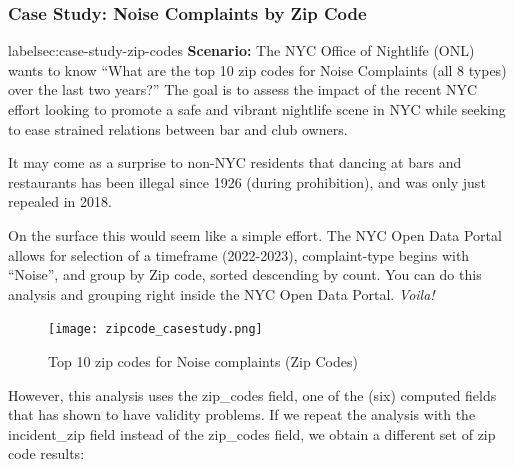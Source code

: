 \documentclass[12pt, titlepage]{article}
\begin{document}
		\subsubsection{Case Study: Noise Complaints by Zip Code}{label{sec:case-study-zip-codes}
		\textbf{Scenario:} The NYC Office of Nightlife (ONL) wants to know ``What are the top 10 zip codes for Noise Complaints (all 8 types) over the last two years?''
		The goal is to assess the impact of the recent NYC effort looking to promote a safe and vibrant nightlife scene in NYC while seeking to ease
		strained relations between bar and club owners. 
		
		It may come as a surprise to non-NYC residents that dancing at bars and restaurants has been illegal since 1926 (during prohibition), and was only just repealed in 2018. 
		
		On the surface this would seem like a simple effort.  The NYC Open Data Portal allows for selection of a timeframe (2022-2023), complaint-type
		begins with ``Noise'', and group by Zip code, sorted descending by count.  You can do this analysis and grouping right inside the NYC Open Data Portal. \textit{Voila!}

	\begin{figure}[H]
	    		\centering
	    		\texttt{[image: zipcode\_casestudy.png]}
	    		\caption{Top 10 zip codes for Noise complaints (Zip Codes)}
	    	\label{fig:casestudy1-zipcodes}
		\end{figure}
	
		However, this analysis uses the zip\_codes field, one of the (six) computed fields that has shown to have validity problems. If we repeat the analysis with the 
		incident\_zip field instead of the zip\_codes field, we obtain a different set of zip code results:
		
}
\end{document}
